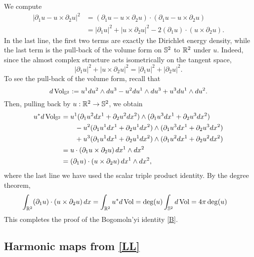 We compute
    \begin{align*}
        |\partial_1 u - u \times \partial_2 u |^2 
            &= (\partial_1 u - u \times \partial_2 u) \cdot (\partial_1 u - u \times \partial_2 u)\\
            &= |\partial_1 u|^2 + |u \times \partial_2 u|^2 - 2 (\partial_1 u) \cdot (u \times \partial_2 u) .
    \end{align*}
In the last line, the first two terms are exactly the Dirichlet energy density, while the last term is the pull-back of the volume form on $\mathbb S^2$ to $\mathbb R^2$ under $u$. Indeed, since the almost complex structure acts isometrically on the tangent space,    
    \[
        |\partial_1 u|^2 + |u \times \partial_2 u|^2 = |\partial_1 u|^2 + |\partial_2 u|^2. 
    \]
To see the pull-back of the volume form, recall that 
    \[
        d\operatorname{Vol}_{\mathbb S^2}
            := u^1 du^2 \wedge du^3 - u^2 du^1 \wedge du^3 + u^3 du^1 \wedge du^2.
    \]
Then, pulling back by $u : \mathbb R^2 \to \mathbb S^2$, we obtain 
    \begin{align*}
        u^* d \operatorname{Vol}_{\mathbb S^2}
            &= u^1 (\partial_1 u^2 dx^1 + \partial_2 u^2 dx^2) \wedge  (\partial_1 u^3 dx^1 + \partial_2 u^3 dx^2) \\
            &\qquad - u^2 (\partial_1 u^1 dx^1 + \partial_2 u^1 dx^2)  \wedge (\partial_1 u^3 dx^1 + \partial_2 u^3 dx^2)  \\
            &\qquad + u^3 (\partial_1 u^1 dx^1 + \partial_2 u^1 dx^2)  \wedge  (\partial_1 u^2 dx^1 + \partial_2 u^2 dx^2) \\
            &= u \cdot (\partial_1 u \times \partial_2 u) \, dx^1 \wedge dx^2\\
            &=  (\partial_1 u) \cdot (u \times \partial_2 u) \, dx^1 \wedge dx^2, 
    \end{align*}
where the last line we have used the scalar triple product identity. By the degree theorem, 
    \begin{align*}
        \int_{\mathbb R^2} (\partial_1 u) \cdot (u \times \partial_2 u) \, dx
            &= \int_{\mathbb R^2} u^* d\operatorname{Vol} = \deg(u) \int_{\mathbb S^2} d\operatorname{Vol} = 4\pi  \deg(u)
    \end{align*}
This completes the proof of the Bogomoln'yi identity \eqref{B}. 


\subsection{Harmonic maps from \eqref{LL}}

